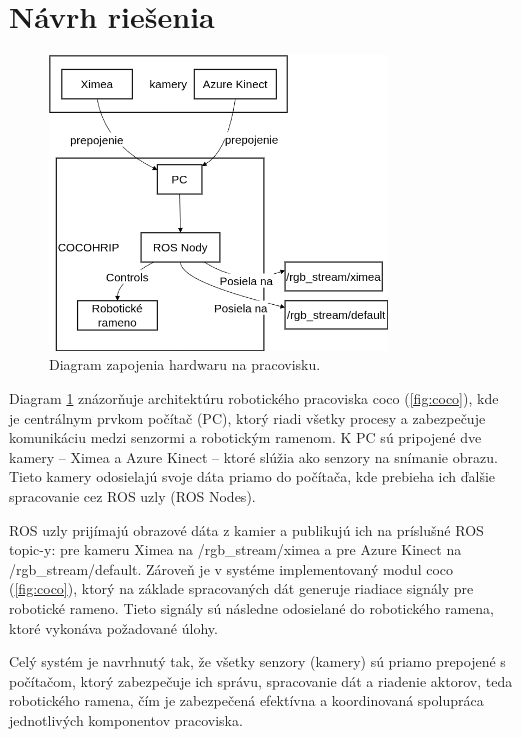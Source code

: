 \section{Návrh riešenia}        %
\label{sec:solution_design}
\begin{figure}[!htpb]
    \centering
    \includegraphics[width=0.8\textwidth]{img/main_diagram.png}
    \caption{Diagram zapojenia hardwaru na pracovisku.}
    \label{fig:main_diagram}
\end{figure}
Diagram \ref{fig:main_diagram} znázorňuje architektúru robotického pracoviska \gls{coco} (\ref{fig:coco}), kde je centrálnym prvkom počítač (PC), ktorý riadi všetky procesy a zabezpečuje komunikáciu medzi senzormi a robotickým ramenom. K PC sú pripojené dve kamery – Ximea a Azure Kinect – ktoré slúžia ako senzory na snímanie obrazu. Tieto kamery odosielajú svoje dáta priamo do počítača, kde prebieha ich ďalšie spracovanie cez ROS uzly (ROS Nodes).

ROS uzly prijímajú obrazové dáta z kamier a publikujú ich na príslušné ROS topic-y: pre kameru Ximea na /rgb\_stream/ximea a pre Azure Kinect na /rgb\_stream/default. Zároveň je v systéme implementovaný modul \gls{coco} (\ref{fig:coco}), ktorý na základe spracovaných dát generuje riadiace signály pre robotické rameno. Tieto signály sú následne odosielané do robotického ramena, ktoré vykonáva požadované úlohy.

Celý systém je navrhnutý tak, že všetky senzory (kamery) sú priamo prepojené s počítačom, ktorý zabezpečuje ich správu, spracovanie dát a riadenie aktorov, teda robotického ramena, čím je zabezpečená efektívna a koordinovaná spolupráca jednotlivých komponentov pracoviska.

